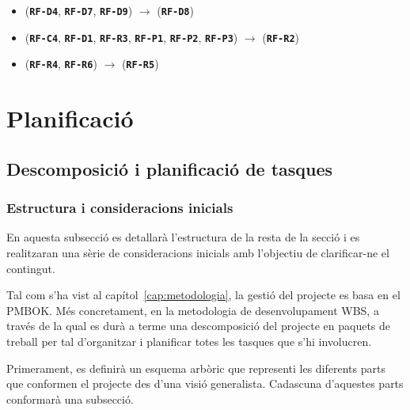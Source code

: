\documentclass[a4paper,12pt]{ThesisStyle}
\begin{document}
\begin{itemize}
  \item (\texttt{\textbf{RF-D4}}, \texttt{\textbf{RF-D7}}, \texttt{\textbf{RF-D9}}) \hspace{1pt} $\longrightarrow$ \hspace{1pt} (\texttt{\textbf{RF-D8}})
  \item (\texttt{\textbf{RF-C4}}, \texttt{\textbf{RF-D1}}, \texttt{\textbf{RF-R3}}, \texttt{\textbf{RF-P1}}, \texttt{\textbf{RF-P2}}, \texttt{\textbf{RF-P3}}) \hspace{1pt} $\longrightarrow$ \hspace{1pt} (\texttt{\textbf{RF-R2}})
  \item (\texttt{\textbf{RF-R4}}, \texttt{\textbf{RF-R6}}) \hspace{1pt} $\longrightarrow$ \hspace{1pt} (\texttt{\textbf{RF-R5}})
\end{itemize}

\chapter{Planificació}
\label{cap:planificacio}

\section{Descomposició i planificació de tasques}
\label{sec:descomposicio_planificacio_tasques}

\subsection{Estructura i consideracions inicials}
\label{subsec:panificacio_tasques_intro}

En aquesta subsecció es detallarà l'estructura de la resta de la secció i es realitzaran una sèrie de consideracions inicials amb l'objectiu de clarificar-ne el contingut.

Tal com s'ha vist al capítol~\ref{cap:metodologia}, la gestió del projecte es basa en el PMBOK. Més concretament, en la metodologia de desenvolupament WBS, a través de la qual es durà a terme una descomposició del projecte en paquets de treball per tal d'organitzar i planificar totes les tasques que s'hi involucren.

Primerament, es definirà un esquema arbòric que representi les diferents parts que conformen el projecte des d'una visió generalista. Cadascuna d'aquestes parts conformarà una subsecció.
\end{document}
